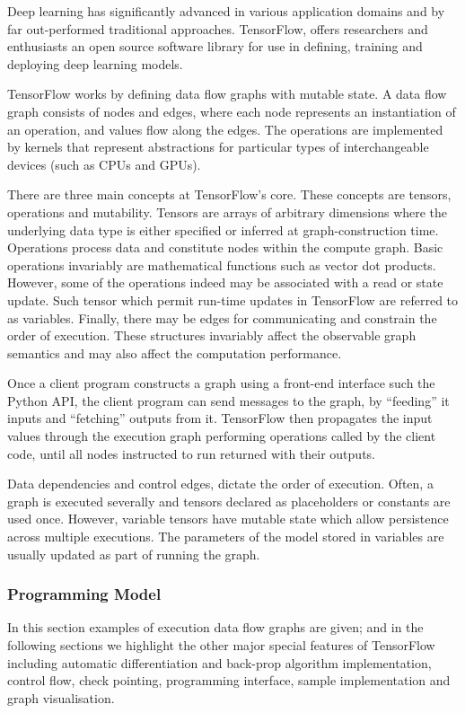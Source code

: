 Deep learning has significantly advanced in various application domains and by far out-performed traditional approaches.  TensorFlow, offers researchers and enthusiasts an open source software library for use in defining, training and deploying deep learning models.

TensorFlow works by defining data flow graphs with mutable state.  A data flow graph consists of nodes and edges, where each node represents an instantiation of an operation, and values flow along the edges. The operations are implemented by kernels that represent abstractions for particular types of interchangeable devices (such as CPUs and GPUs).

There are three main concepts at TensorFlow's core.  These concepts are tensors, operations and mutability.  Tensors are arrays of arbitrary dimensions where the underlying data type is either specified or inferred at graph-construction time. Operations process data and constitute nodes within the compute graph. Basic operations invariably are mathematical functions such as vector dot products.  However, some of the operations indeed may be associated with a read or state update. Such tensor which permit run-time updates in TensorFlow are referred to as variables.  Finally, there may be edges for communicating and constrain the order of execution. These structures invariably affect the observable graph semantics and may also affect the computation performance. 

Once a client program constructs a graph using a front-end interface such the Python API, the client program can send messages to the graph, by “feeding” it inputs and “fetching” outputs from it. TensorFlow then propagates the input values through the execution graph performing  operations called by the client code, until all nodes instructed to run returned with their outputs. 

Data dependencies and control edges, dictate the order of execution. Often, a graph is executed severally and tensors declared as placeholders or constants are used once. However, variable tensors have mutable state which allow persistence across multiple executions. The parameters of the model stored in variables are usually updated as part of running the graph.

\subsubsection{Programming Model}
In this section examples of execution data flow graphs are given; and in the following sections we highlight the other major special features of TensorFlow including automatic differentiation and back-prop algorithm implementation, control flow, check pointing, programming interface, sample implementation and graph visualisation.

